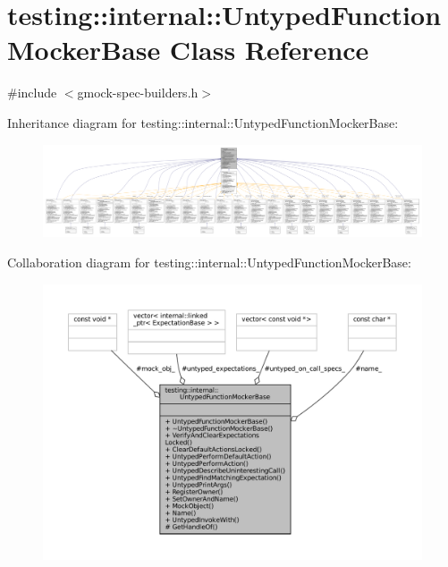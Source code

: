 \hypertarget{classtesting_1_1internal_1_1UntypedFunctionMockerBase}{}\section{testing\+:\+:internal\+:\+:Untyped\+Function\+Mocker\+Base Class Reference}
\label{classtesting_1_1internal_1_1UntypedFunctionMockerBase}


{\ttfamily \#include $<$gmock-\/spec-\/builders.\+h$>$}



Inheritance diagram for testing\+:\+:internal\+:\+:Untyped\+Function\+Mocker\+Base\+:
\nopagebreak
\begin{figure}[H]
\begin{center}
\leavevmode
\includegraphics[width=350pt]{classtesting_1_1internal_1_1UntypedFunctionMockerBase__inherit__graph}
\end{center}
\end{figure}


Collaboration diagram for testing\+:\+:internal\+:\+:Untyped\+Function\+Mocker\+Base\+:
\nopagebreak
\begin{figure}[H]
\begin{center}
\leavevmode
\includegraphics[width=350pt]{classtesting_1_1internal_1_1UntypedFunctionMockerBase__coll__graph}
\end{center}
\end{figure}
